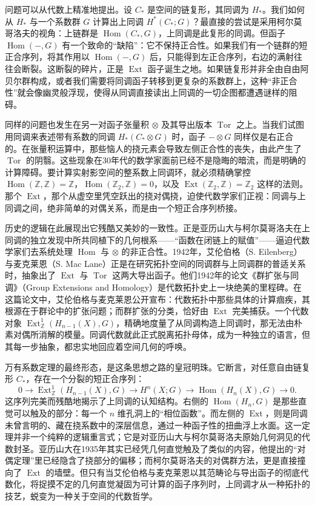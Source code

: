 \documentclass[12pt,a4paper]{article}
\begin{document}
问题可以从代数上精准地提出。设 $C_*$ 是空间的链复形，其同调为 $H_*$。我们如何从 $H_*$ 与一个系数群 $G$ 计算出上同调 $H^*(C_*; G)$？最直接的尝试是采用柯尔莫哥洛夫的视角：上链群是 $\operatorname{Hom}(C_*, G)$，上同调是此复形的同调。但函子 $\operatorname{Hom}(-, G)$ 有一个致命的“缺陷”：它不保持正合性。如果我们有一个链群的短正合序列，将其作用以 $\operatorname{Hom}(-, G)$ 后，只能得到左正合序列，右边的满射往往会断裂。这断裂的碎片，正是 $\operatorname{Ext}$ 函子诞生之地。如果链复形并非全由自由阿贝尔群构成，或者我们需要将同调函子转移到更复杂的系数群上，这种“非正合性”就会像幽灵般浮现，使得从同调直接读出上同调的一切企图都遭遇谜样的阻碍。

同样的问题也发生在另一对函子张量积 $\otimes$ 及其导出版本 $\operatorname{Tor}$ 之上。当我们试图用同调来表述带有系数的同调 $H_*(C_* \otimes G)$ 时，函子 $- \otimes G$ 同样仅是右正合的。在张量积运算中，那些恼人的挠元素会导致左侧正合性的丧失，由此产生了 $\operatorname{Tor}$ 的阴翳。这些现象在30年代的数学家面前已经不是隐晦的暗流，而是明确的计算障碍。要计算实射影空间的整系数上同调环，就必须精确掌控 $\operatorname{Hom}(\mathbb{Z}, \mathbb{Z}) = \mathbb{Z}$，$\operatorname{Hom}(\mathbb{Z}_2, \mathbb{Z}) = 0$，以及 $\operatorname{Ext}(\mathbb{Z}_2, \mathbb{Z}) = \mathbb{Z}_2$ 这样的法则。那个 $\operatorname{Ext}$，那个从虚空里凭空跃出的挠对偶挠，迫使代数学家们正视：同调与上同调之间，绝非简单的对偶关系，而是由一个短正合序列桥接。

历史的逻辑在此展现出它残酷又美妙的一致性。正是亚历山大与柯尔莫哥洛夫在上同调的独立发现中所共同植下的几何根系——“函数在闭链上的赋值”——逼迫代数学家们去系统处理 $\operatorname{Hom}$ 与 $\otimes$ 的非正合性。1942年，艾伦伯格（S. Eilenberg）与麦克莱恩（S. Mac Lane）正是在研究拓扑空间的同调群与上同调群的普适关系时，抽象出了 $\operatorname{Ext}$ 与 $\operatorname{Tor}$ 这两大导出函子。他们1942年的论文《群扩张与同调》（Group Extensions and Homology）是代数拓扑史上一块绝美的里程碑。在这篇论文中，艾伦伯格与麦克莱恩公开宣布：代数拓扑中那些具体的计算痼疾，其根源在于群论中的扩张问题；而群扩张的分类，恰好由 $\operatorname{Ext}$ 完美捕获。一个代数对象 $\operatorname{Ext}^1_{\mathbb{Z}}(H_{n-1}(X), G)$，精确地度量了从同调构造上同调时，那无法由朴素对偶所消解的模量。同调代数就此正式脱离拓扑母体，成为一种独立的语言，但其每一步抽象，都忠实地回应着空间几何的呼唤。

万有系数定理的最终形态，是这条思想之路的皇冠明珠。它断言，对任意自由链复形 $C_*$，存在一个分裂的短正合序列：
$$
0 \longrightarrow \operatorname{Ext}^1_{\mathbb{Z}}(H_{n-1}(X), G) \longrightarrow H^n(X; G) \longrightarrow \operatorname{Hom}(H_n(X), G) \longrightarrow 0.
$$
这序列完美而残酷地揭示了上同调的认知结构。右侧的 $\operatorname{Hom}(H_n, G)$ 是那些直觉可以触及的部分：每一个 $n$ 维孔洞上的“相位函数”。而左侧的 $\operatorname{Ext}$，则是同调未曾言明的、藏在挠系数中的深层信息，通过一种函子性的扭曲浮上水面。这一定理并非一个纯粹的逻辑重言式；它是对亚历山大与柯尔莫哥洛夫原始几何洞见的代数封圣。亚历山大在1935年其实已经凭几何直觉触及了类似的内容，他提出的“对偶定理”里已经隐含了挠部分的偏移；而柯尔莫哥洛夫的对偶群方法，更是直接撞向了 $\operatorname{Ext}$ 的墙壁。但只有当艾伦伯格与麦克莱恩以其范畴论与导出函子的彻底代数化，将捉摸不定的几何直觉凝固为可计算的函子序列时，上同调才从一种拓扑的技艺，蜕变为一种关于空间的代数哲学。
\end{document}
